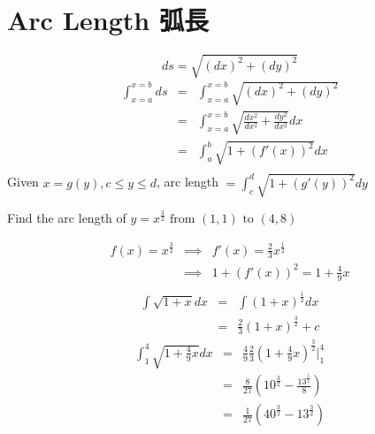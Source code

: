 \section{Arc Length  弧長}
\begin{defn}
\[ds = \sqrt{(dx)^2 + (dy)^2}\]
\[\begin{array}{rcl}
\displaystyle \int^{x=b}_{x=a} ds & = &\displaystyle \int^{x = b}_{x = a} \sqrt{(dx)^2 + (dy)^2}\\
& = & \displaystyle \int^{x = b}_{x = a} \sqrt{\frac{dx^2}{dx^2} + \frac{dy^2}{dx^2}} dx\\
& = & \displaystyle \int^b_a \sqrt{1 + (f'(x))^2} dx\\
\end{array}\]
Given \(x = g(y), c \leq y \leq d\), arc length \( = \displaystyle \int^d_c \sqrt{1 + (g'(y))^2} dy\)
\end{defn}
\begin{eg}
Find the arc length of \(y = x^{\frac{3}{2}} \text{ from } (1, 1) \text{ to } (4, 8)\)

\soln
\[\begin{array}{rcl}
f(x) = x^{\frac{3}{2}} & \implies & \displaystyle f'(x) = \frac{2}{3} x^{\frac{1}{2}}\\
& \implies & \displaystyle 1 + (f'(x))^2 = 1 + \frac{4}{9} x\\
\end{array}\]
\[\begin{array}{rcl}
\displaystyle \int \sqrt{1 + x}dx & = & \displaystyle \int (1 + x)^{\frac{1}{2}} dx\\
& = & \displaystyle \frac{2}{3} (1 + x)^{\frac{3}{2}} + c
\end{array}\]
\[\begin{array}{rcl}
\displaystyle \int^4_1 \sqrt{1 + \frac{4}{9} x} dx & = & \displaystyle \frac{4}{9} \frac{2}{3} (1 + \frac{4}{9} x)^{\frac{3}{2}}\Big|^4_1\\
& = & \displaystyle \frac{8}{27} (10^{\frac{3}{2}} - \frac{13^{\frac{3}{2}}}{8})\\
& = & \displaystyle \frac{1}{27} (40^{\frac{3}{2}} - 13^{\frac{3}{2}})
\end{array}\]
\end{eg}
